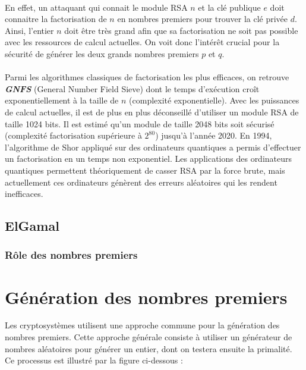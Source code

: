 			\paragraph{}En effet, un attaquant qui connait le module RSA $n$ et la clé publique $e$ doit connaitre la factorisation de $n$ en nombres premiers pour trouver la clé privée $d$. Ainsi, l'entier $n$ doit être très grand afin que sa factorisation ne soit pas possible avec les ressources de calcul actuelles. On voit donc l'intérêt crucial pour la sécurité de générer les deux grands nombres premiers $p$ et $q$.
			\paragraph{}Parmi les algorithmes classiques de factorisation les plus efficaces, on retrouve \textbf{\textit{GNFS}} (General Number Field Sieve) dont le temps d'exécution croît exponentiellement à la taille de $n$ (complexité exponentielle). Avec les puissances de calcul actuelles, il est de plus en plus déconseillé d'utiliser un module RSA de taille 1024 bits. Il est estimé qu'un module de taille 2048 bits soit sécurisé (complexité factorisation supérieure à $2^{80}$) jusqu'à l'année 2020. 
			En 1994, l'algorithme de Shor appliqué sur des ordinateurs quantiques a permis d'effectuer un factorisation en un temps non exponentiel. Les applications des ordinateurs quantiques permettent théoriquement de casser RSA par la force brute, mais actuellement ces ordinateurs génèrent des erreurs aléatoires qui les rendent inefficaces.
			
		
		\subsection{ElGamal}
		
			\subsubsection*{Rôle des nombres premiers}
		
	
	\section{Génération des nombres premiers}
		Les cryptosystèmes utilisent une approche commune pour la génération des nombres premiers. Cette approche générale consiste à utiliser un générateur de nombres aléatoires pour générer un entier, dont on testera ensuite la primalité. Ce processus est illustré par la figure ci-dessous :
		
